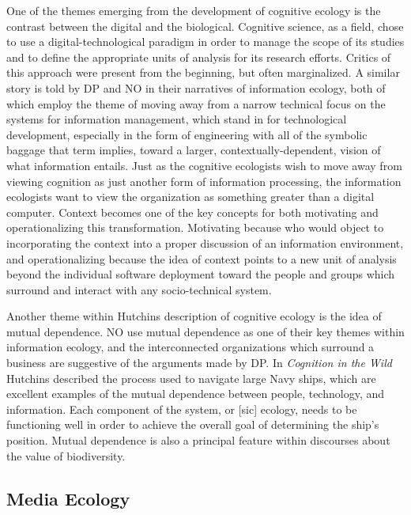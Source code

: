 One of the themes emerging from the development of cognitive ecology is the contrast between the digital and the biological. Cognitive science, as a field, chose to use a digital-technological paradigm in order to manage the scope of its studies and to define the appropriate units of analysis for its research efforts. Critics of this approach were present from the beginning, but often marginalized. A similar story is told by DP and NO in their narratives of information ecology, both of which employ the theme of moving away from a narrow technical focus on the systems for information management, which stand in for technological development, especially in the form of engineering with all of the symbolic baggage that term implies, toward a larger, contextually-dependent, vision of what information entails. Just as the cognitive ecologists wish to move away from viewing cognition as just another form of information processing, the information ecologists want to view the organization as something greater than a digital computer. Context becomes one of the key concepts for both motivating and operationalizing this transformation. Motivating because who would object to incorporating the context into a proper discussion of an information environment, and operationalizing because the idea of context points to a new unit of analysis beyond the individual software deployment toward the people and groups which surround and interact with any socio-technical system.

Another theme within Hutchins description of cognitive ecology is the idea of mutual dependence. NO use mutual dependence as one of their key themes within information ecology, and the interconnected organizations which surround a business are suggestive of the arguments made by DP. In \textit{Cognition in the Wild} Hutchins described the process used to navigate large Navy ships, which are excellent examples of the mutual dependence between people, technology, and information. Each component of the system, or [sic] ecology, needs to be functioning well in order to achieve the overall goal of determining the ship's position. Mutual dependence is also a principal feature within discourses about the value of biodiversity.

\subsection{Media Ecology}

